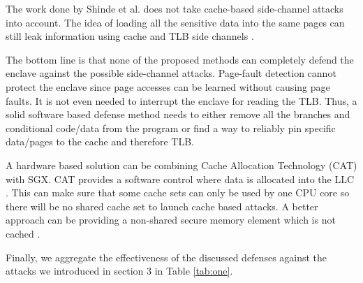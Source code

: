 The work done by Shinde et al. \cite{pigeonhole} does not take cache-based side-channel attacks into account. The idea of loading all the sensitive data into the same pages can still leak information using cache and TLB side channels \cite{leakycauldron}.

The bottom line is that none of the proposed methods can completely defend the enclave against the possible side-channel attacks. Page-fault detection cannot protect the enclave since page accesses can be learned without causing page faults. It is not even needed to interrupt the enclave for reading the TLB. Thus, a solid software based defense method needs to either remove all the branches and conditional code/data from the program or find a way to reliably pin specific data/pages to the cache and therefore TLB.

A hardware based solution can be combining Cache Allocation Technology (CAT) with SGX. CAT provides a software control where data is allocated into the LLC \cite{cat}. This can make sure that some cache sets can only be used by one CPU core so there will be no shared cache set to launch cache based attacks. A better approach can be providing a non-shared secure memory element which is not cached \cite{mge}.

Finally, we aggregate the effectiveness of the discussed defenses against the attacks we introduced in section 3 in Table \ref{tab:one}.

